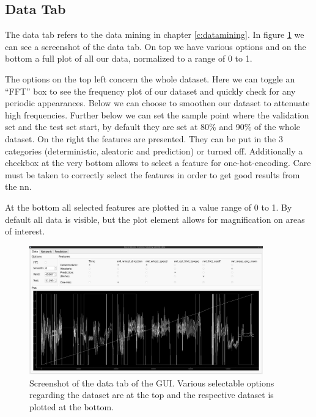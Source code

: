 		\subsection{Data Tab}
		The data tab refers to the data mining in chapter \ref{c:datamining}. In figure \ref{f:gui_data_tab} we can see a screenshot of the data tab. On top we have various options and on the bottom a full plot of all our data, normalized to a range of 0 to 1.
		
		The options on the top left concern the whole dataset. Here we can toggle an \enquote{FFT} box to see the frequency plot of our dataset and quickly check for any periodic appearances. Below we can choose to smoothen our dataset to attenuate high frequencies. Further below we can set the sample point where the validation set and the test set start, by default they are set at 80\% and 90\% of the whole dataset. \newline
		On the right the features are presented. They can be put in the 3 categories (deterministic, aleatoric and prediction) or turned off. Additionally a checkbox at the very bottom allows to select a feature for one-hot-encoding. Care must be taken to correctly select the features in order to get good results from the \ac{nn}. 
		
		At the bottom all selected features are plotted in a value range of 0 to 1. By default all data is visible, but the plot element allows for magnification on areas of interest.
		
		\begin{figure}[htb]
		\centering
		\includegraphics[width=0.9\textwidth]{./4_GUI/gui_data_tab.jpg}
		\caption{Screenshot of the data tab of the GUI. Various selectable options regarding the dataset are at the top and the respective dataset is plotted at the bottom.}
		\label{f:gui_data_tab}
		\end{figure}

